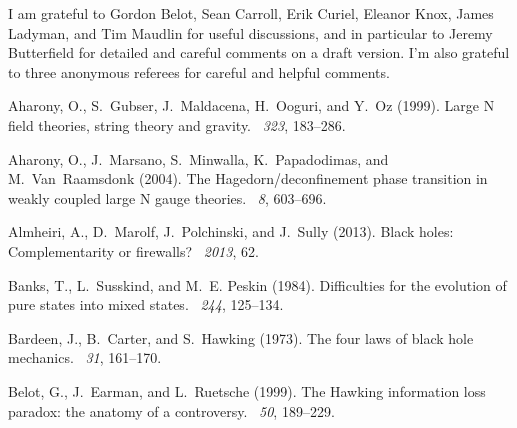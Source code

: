 \documentclass{article}
\begin{document}
I am grateful to Gordon Belot, Sean Carroll, Erik Curiel, Eleanor Knox, James Ladyman, and Tim Maudlin for useful discussions, and in particular to Jeremy Butterfield for detailed and careful comments on a draft version. I'm also grateful to three anonymous referees for careful and helpful comments.


%
%

\begin{thebibliography}{}

Aharony, O., S.~Gubser, J.~Maldacena, H.~Ooguri, and Y.~Oz (1999).
\newblock Large {N} field theories, string theory and gravity.
~{\em 323}, 183--286.

Aharony, O., J.~Marsano, S.~Minwalla, K.~Papadodimas, and M.~Van~Raamsdonk
  (2004).
\newblock The {H}agedorn/deconfinement phase transition in weakly coupled large
  {N} gauge theories.
~{\em 8},
  603--696.

Almheiri, A., D.~Marolf, J.~Polchinski, and J.~Sully (2013).
\newblock Black holes: Complementarity or firewalls?
~{\em 2013}, 62.

Banks, T., L.~Susskind, and M.~E. Peskin (1984).
\newblock Difficulties for the evolution of pure states into mixed states.
~{\em 244}, 125--134.

Bardeen, J., B.~Carter, and S.~Hawking (1973).
\newblock The four laws of black hole mechanics.
~{\em 31}, 161--170.

Belot, G., J.~Earman, and L.~Ruetsche (1999).
\newblock The {H}awking information loss paradox: the anatomy of a controversy.
~{\em 50},
  189--229.


\end{thebibliography}
\end{document}
